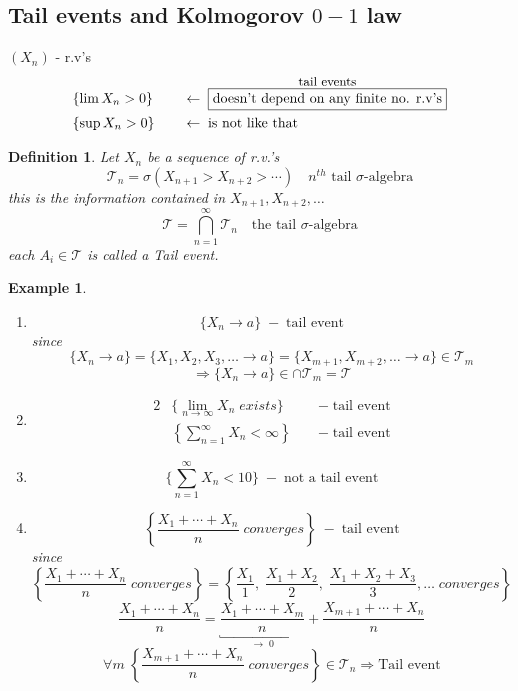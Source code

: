 \documentclass[12pt]{article}
\newtheorem{definition}{Definition}[section]
\newtheorem{example}{Example}[section]
\begin{document}
\subsection{Tail events and Kolmogorov $0-1$ law}
$(X_n)$ - r.v's
\begin{alignat*}{2}
&\{\lim X_n >0\} &\quad &\leftarrow \; \overset{\text{\small tail events}}{\boxed{\text{doesn't depend on any finite no. r.v's}}}\\
&\{\sup X_n >0\} &\quad &\leftarrow \; \text{is not like that}
\end{alignat*}

\begin{definition}Let $X_n$ be a sequence of r.v.'s 
\[\mathcal{T}_n =\sigma(X_{n+1}>X_{n+2}> \cdots ) \quad \text{$n^{th}$ tail $\sigma$-algebra} \]
this is the information contained in $X_{n+1}, X_{n+2}, \dots$ 
\[\mathcal{T} = \bigcap_{n=1}^{\infty}\mathcal{T}_n  \quad \text{the tail $\sigma$-algebra} \]
each $A_i \in \mathcal{T}$ is called a Tail event.
\end{definition}

\begin{example}\quad \\
\begin{enumerate}
\item \[\{X_n \rightarrow a\} \; - \; \text{tail event}\]
since
\[\{X_n \rightarrow a\} = \{X_1, X_2, X_3,\dots \rightarrow a\} = \{X_{m+1}, X_{m+2}, \dots \rightarrow a\} \in \mathcal{T}_m\]
\[\Rightarrow \{X_n \rightarrow a\} \in \cap \mathcal{T}_m = \mathcal{T}\]
\item
\begin{alignat*}{2}
&\{\lim_{n\rightarrow \infty}X_n \; exists\} &\; &- \; \text{tail event}\\
&\left\{\sum\limits_{n=1}^{\infty}X_n < \infty\right\} &\; &-  \; \text{tail event}
\end{alignat*}
\item \[\{\sum\limits_{n=1}^{\infty}X_n < 10\} \; -  \; \text{not a tail event} \]
\item \[\left\{\frac{X_1 + \cdots +X_n }{n} \; converges\right\} \; -  \; \text{tail event}\]
since
\[\left\{\frac{X_1 + \cdots +X_n }{n} \; converges\right\} = \left\{\frac{X_1 }{1}, \; \frac{X_1 + X_2 }{2}, \;\frac{X_1+ X_2 +X_3 }{3}, \dots \; converges\right\}\]
\[\frac{X_1 + \cdots +X_n }{n} = \underbracket{\frac{X_1 + \cdots +X_m }{n}}_{\rightarrow \; 0} + \frac{X_{m+1} + \cdots +X_n }{n}\]
\[ \forall m \; \left\{\frac{X_{m+1} + \cdots +X_n }{n} \; converges\right\} \in \mathcal{T}_n \Rightarrow \text{Tail event}\]
\end{enumerate}
\end{example}
\end{document}

